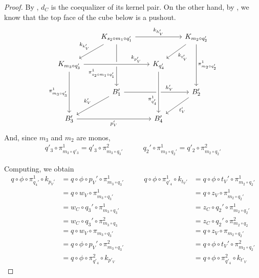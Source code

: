 \documentclass[a4paper,UKenglish,cleveref,pdftex,thm-restate,numberwithinsect]{lipics-v2021}
\begin{document}
\begin{proof}
	By , $d_C$ is the coequalizer of its kernel pair. On the other hand, by , we know that the top face of the cube below is a pushout.
	\[\begin{tikzcd}[row sep=20, column sep = 20]
		& {K_{s_2\circ m_1 \circ q_1'}} && {K_{m_2\circ q_2'}} \\
		{K_{m_3 \circ q_3'}} && {K_{q_4'}} \\
		& {B'_1} && {B'_2} \\
		{B'_3} && {B'_4}
		\arrow["{k_{h'_V}}", from=1-2, to=1-4]
		\arrow["{k_{k_V'}}"', from=1-2, to=2-1]
		\arrow["{\pi_{s_2\circ m_1 \circ q_1'}^1}"'{pos=0.7}, from=1-2, to=3-2]
		\arrow["{k_{t_V'}}", from=1-4, to=2-3]
		\arrow["{\pi_{m_2\circ q_2'}^1}", from=1-4, to=3-4]
		\arrow["{k_{p_V'}}"{pos=0.8}, from=2-1, to=2-3, crossing over]
		\arrow["{\pi_{m_3 \circ q_3'}^1}"', from=2-1, to=4-1]
		\arrow["{h_V'}"{pos=0.7}, from=3-2, to=3-4]
		\arrow["{\pi_{q_4'}^1}"'{pos=0.7}, from=2-3, to=4-3, crossing over]
		\arrow["{k_V'}"', from=3-2, to=4-1]
		\arrow["{t_V'}", from=3-4, to=4-3]
		\arrow["{p_V'}"', from=4-1, to=4-3]
	\end{tikzcd}\]
	And, since $m_3$ and $m_2$ are monos,
	\[\begin{split}
		q'_3 \circ \pi_{m_3 \circ q'_3}^1 = q'_3 \circ \pi_{m_3\circ q_3'}^2
	\end{split}\qquad\begin{split}
		q_2' \circ \pi_{m_2 \circ q_2'}^1 = q'_2 \circ \pi_{m_2 \circ q_2'}^2
	\end{split}\]
	
	Computing, we obtain
	\[\begin{split}
		q \circ \phi \circ \pi_{q_4'}^1 \circ k_{p_V'} &= q \circ \phi \circ p_V' \circ \pi_{m_3 \circ q_3'}^1 \\ &= q \circ w_V \circ \pi_{m_3 \circ q_3'}^1 \\ &= w_C \circ q_3' \circ \pi_{m_3 \circ q_3'}^1 \\ &= w_C \circ q_3' \circ \pi_{m_3 \circ q_3}^2 \\ &= q \circ w_V \circ \pi_{m_3 \circ q_3'} \\ &= q \circ \phi \circ p_V' \circ \pi_{m_3 \circ q_3'}^2 \\ &= q \circ \phi \circ \pi_{q'_4}^2 \circ k_{p'_V}
	\end{split}\qquad\begin{split}
		q \circ \phi \circ \pi_{q'_4}^1 \circ k_{t_V'} &= q \circ \phi \circ t_V' \circ \pi_{m_2 \circ q_2'}^1 \\ &= q \circ z_V \circ \pi_{m_2 \circ q_2'}^1 \\ &= z_C \circ q_2' \circ \pi_{m_2 \circ q_2'}^1 \\ &= z_C \circ q_2' \circ \pi_{m_2 \circ q_2}^2 \\ &= q \circ z_V \circ \pi_{m_2 \circ q_2'} \\ &= q \circ \phi \circ t_V' \circ \pi_{m_2 \circ q_2'}^2 \\ &= q \circ \phi \circ \pi_{q'_4}^2 \circ k_{t'_V}
	\end{split}\]
	

\end{proof}
\end{document}

